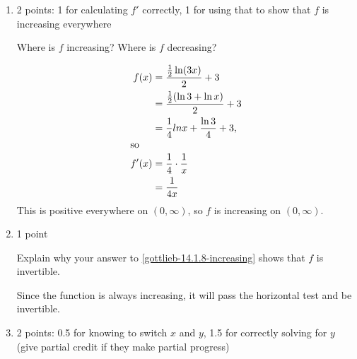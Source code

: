 \documentclass{article}
\begin{document}
\begin{enumerate}
\begin{enumerate}
\begin{solution}
        Then, we can see that $f'(x) = \dfrac{1}{4x}$
    \end{solution}


  \item \label{gottlieb-14.1.8-increasing}

    \begin{grading}
      2 points: 1 for calculating $f'$ correctly, 1 for using that to show  that $f$ is increasing everywhere
    \end{grading}



    \begin{problem}[\vfill]
      Where is $f$ increasing? Where is $f$ decreasing? 
    \end{problem}

    \begin{solution}
      \begin{align*}
        f(x) &= \frac{\frac{1}{2} \ln (3x)}{2} + 3 \\
        &= \frac{\frac{1}{2} (\ln 3 + \ln x)}{2} + 3 \\
        &= \frac{1}{4} ln x + \frac{\ln 3}{4} + 3, \\
        \shortintertext{so}
        f'(x) &= \frac{1}{4} \cdot \frac{1}{x} \\
        &= \frac{1}{4x}
      \end{align*}
      This is positive everywhere on $(0, \infty)$, so $f$ is increasing on $(0, \infty)$. 
    \end{solution} 

  \item

    \begin{grading}
      1 point
    \end{grading}

    \begin{problem}[0.75in]
      Explain why your answer to \ref{gottlieb-14.1.8-increasing} shows that $f$ is invertible. 
    \end{problem}

    \begin{solution} 
      Since the function is always increasing, it will pass the horizontal test and be invertible.  
    \end{solution}

  \item

    \begin{grading}
      2 points: 0.5 for knowing to switch $x$ and $y$, 1.5 for correctly solving for $y$ (give partial credit if they make partial progress)
    \end{grading}


\end{enumerate}
\end{enumerate}
\end{document}
